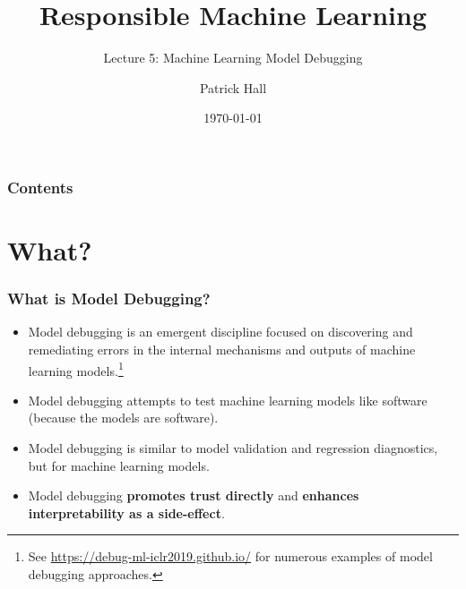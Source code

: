 \documentclass[11pt,
               aspectratio=169,
               hyperref={colorlinks}
               ]{beamer}
\author{Patrick Hall}
\title{Responsible Machine Learning}
\subtitle{Lecture 5: Machine Learning Model Debugging}
\institute{The George Washington University}
\date{\today}
\begin{document}
	
	\maketitle
	
	\begin{frame}
	
		\frametitle{Contents}
		
		\tableofcontents{}
		
	\end{frame}

	\section{What?}

	\begin{frame}
		
		\frametitle{What is Model Debugging?}
		
		\begin{itemize}
			\item Model debugging is an emergent discipline focused on discovering and remediating errors in the internal mechanisms and outputs of machine learning models.\footnote{\tiny{See \url{https://debug-ml-iclr2019.github.io/} for numerous examples of model debugging approaches.}} 
			\item Model debugging attempts to test machine learning models like software (because the models are software).
			\item Model debugging is similar to model validation and regression diagnostics, but for machine learning models.
			\item Model debugging \textbf{promotes trust directly} and \textbf{enhances interpretability as a side-effect}.
		\end{itemize}
		
	\end{frame}
	

          
  
\end{document}
